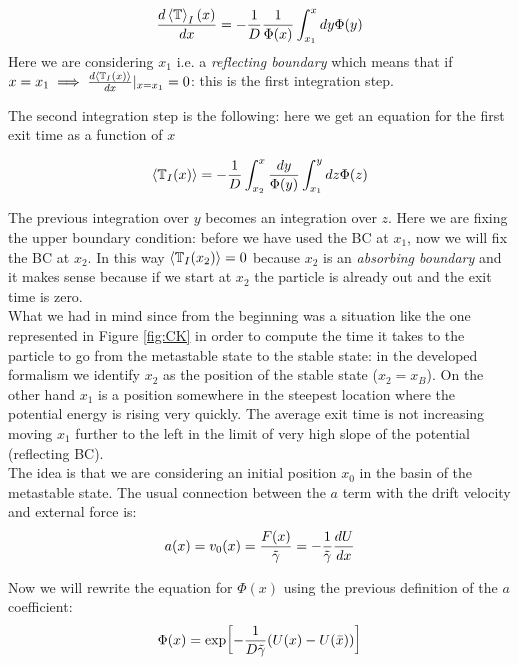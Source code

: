 \documentclass[\main/main.tex]{subfiles}
\begin{document}
\begin{eqnarray}
    \frac{d\left\langle \mathbb{T} \right\rangle_I (x)}{dx}=-\frac{1}{D}\frac{1}{\Phi(x)}\int_{x_1} ^x dy\Phi(y)
\end{eqnarray}
Here we are considering $x_1$ i.e. a \textit{reflecting boundary} which means that if $x=x_1 \implies \frac{d\left\langle \mathbb{T}_I (x) \right\rangle}{dx}|_{x=x_1}=0$: this is the first integration step.

The second integration step is the following: here we get an equation for the first exit time as a function of $x$

\begin{eqnarray}
    \left\langle \mathbb{T}_I (x) \right\rangle=-\frac{1}{D}\int_{x_2} ^x\frac{dy}{\Phi(y)}\int_{x_1}^y dz \Phi (z)
    \label{eq:miao}
\end{eqnarray}

The previous integration over $y$ becomes an integration over $z$. Here we are fixing the upper boundary condition: before we have used the BC at $x_1$, now we will fix the BC at $x_2$. In this way $\left\langle \mathbb{T}_I (x_2) \right\rangle=0$ because $x_2$ is an \textit{absorbing boundary} and it makes sense because if we start at $x_2$ the particle is already out and the exit time is zero. \\

What we had in mind since from the beginning was a situation like the one represented in Figure \ref{fig:CK} in order to compute the time it takes to the particle to go from the metastable state to the stable state: in the developed formalism we identify $x_2$ as the position of the stable state ($x_2=x_B$). On the other hand $x_1$ is a position somewhere in the steepest location where the potential energy is rising very quickly. The average exit time is not increasing moving $x_1$ further to the left in the limit of very high slope of the potential (reflecting BC). \\

The idea is that we are considering an initial position $x_0$ in the basin of the metastable state. The usual connection between the $a$ term with the drift velocity and external force is:
\begin{eqnarray}
    a(x)=v_0(x)=\frac{F(x)}{\Tilde{\gamma}}=-\frac{1}{\Tilde{\gamma}}\frac{d U}{dx}
\end{eqnarray}

Now we will rewrite the equation for $\Phi(x)$ using the previous definition of the $a$ coefficient:
\begin{eqnarray}
    \Phi(x)=\exp[-\frac{1}{D\Tilde{\gamma}}(U(x)-U(\Bar{x}))]
\end{eqnarray}
\end{document}

